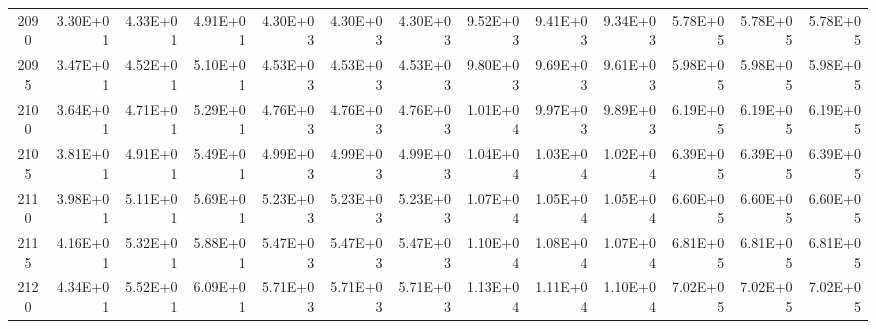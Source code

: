 \documentclass{article}
\begin{document}
\begin{table}
\begin{tabular}{crrr|rrr|rrr|rrr}
2090     & 3.30E+01 & 4.33E+01 & 4.91E+01 & 4.30E+03 & 4.30E+03 & 4.30E+03 & 9.52E+03 & 9.41E+03 & 9.34E+03 & 5.78E+05 & 5.78E+05 & 5.78E+05 \\
2095     & 3.47E+01 & 4.52E+01 & 5.10E+01 & 4.53E+03 & 4.53E+03 & 4.53E+03 & 9.80E+03 & 9.69E+03 & 9.61E+03 & 5.98E+05 & 5.98E+05 & 5.98E+05 \\
2100     & 3.64E+01 & 4.71E+01 & 5.29E+01 & 4.76E+03 & 4.76E+03 & 4.76E+03 & 1.01E+04 & 9.97E+03 & 9.89E+03 & 6.19E+05 & 6.19E+05 & 6.19E+05 \\
2105     & 3.81E+01 & 4.91E+01 & 5.49E+01 & 4.99E+03 & 4.99E+03 & 4.99E+03 & 1.04E+04 & 1.03E+04 & 1.02E+04 & 6.39E+05 & 6.39E+05 & 6.39E+05 \\
2110     & 3.98E+01 & 5.11E+01 & 5.69E+01 & 5.23E+03 & 5.23E+03 & 5.23E+03 & 1.07E+04 & 1.05E+04 & 1.05E+04 & 6.60E+05 & 6.60E+05 & 6.60E+05 \\
2115     & 4.16E+01 & 5.32E+01 & 5.88E+01 & 5.47E+03 & 5.47E+03 & 5.47E+03 & 1.10E+04 & 1.08E+04 & 1.07E+04 & 6.81E+05 & 6.81E+05 & 6.81E+05 \\
2120     & 4.34E+01 & 5.52E+01 & 6.09E+01 & 5.71E+03 & 5.71E+03 & 5.71E+03 & 1.13E+04 & 1.11E+04 & 1.10E+04 & 7.02E+05 & 7.02E+05 & 7.02E+05
\end{tabular}
\end{table}
\end{document}
